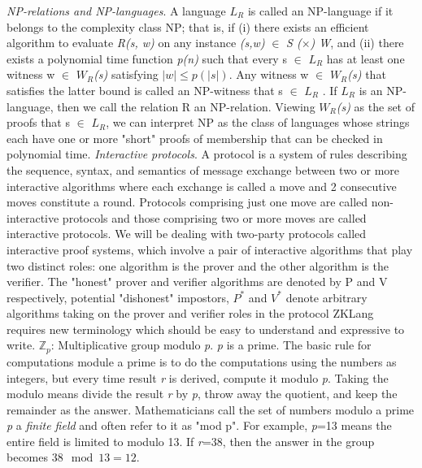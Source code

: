 \documentclass[a4paper]{article}
\begin{document}
  \newline
  \newline
  \textit{NP-relations and NP-languages}. A language \textit{$L_R$} is called an NP-language if it belongs to the complexity class NP; that is, if (i) there exists an efficient algorithm to evaluate \textit{R(s, w)} on any instance \textit{(s,w)} $\in$ \textit{S ($\times$) W}, and (ii) there exists a polynomial time function \emph{p(n)} such that every s $\in$ \textit{$L_R$} has at least one witness w $\in$ \textit{$W_R$(s)} satisfying $|w|\leq p(|s|)$.
  Any witness w $\in$ \textit{$W_R$(s)} that satisfies the latter bound is called an NP-witness that s $\in$ \textit{$L_R$} . If \textit{$L_R$} is an NP-language, then we call the relation R an NP-relation. Viewing \textit{$W_R$(s)} as the set of proofs that s $\in$ \textit{$L_R$}, we can interpret NP as the class of languages whose strings each have one or more "short" proofs of membership that can be checked in polynomial time.
  \newline
  \newline
  \textit{Interactive protocols}. A protocol is a system of rules describing the sequence, syntax, and semantics of message exchange between two or more interactive algorithms where each exchange is called a move and 2 consecutive moves constitute a round. Protocols comprising just one move are called non-interactive protocols and those comprising two or more moves are called interactive protocols. We will be dealing with two-party protocols called interactive proof systems, which involve a pair of interactive algorithms that play two distinct roles: one algorithm is the prover and the other algorithm is the verifier. The "honest" prover and verifier algorithms are denoted by P and V respectively, potential "dishonest" impostors, \textit{$P^{*}$} and \textit{$V^{*}$} denote arbitrary algorithms taking on the prover and verifier roles in the protocol 
  \newline
  \newline
  ZKLang requires new terminology which should be easy to understand and expressive to write.
  \newline
  \newline
  \indent $\mathbb{Z}_p$: Multiplicative group modulo \emph{p}. \emph{p} is a prime. The basic rule for computations module a prime is to do the computations using the numbers as integers, but every time result \emph{r} is derived, compute it modulo \emph{p}. Taking the modulo means divide the result \emph{r} by \emph{p}, throw away the quotient, and keep the remainder as the answer. Mathematicians call the set of numbers modulo a prime \emph{p} a \emph{finite field} and often refer to it as "mod p". For example, \emph{p}=13 means the entire field is limited to modulo 13. If \emph{r}=38, then the answer in the group becomes $38\mod{13}=12$. \newline
\end{document}
